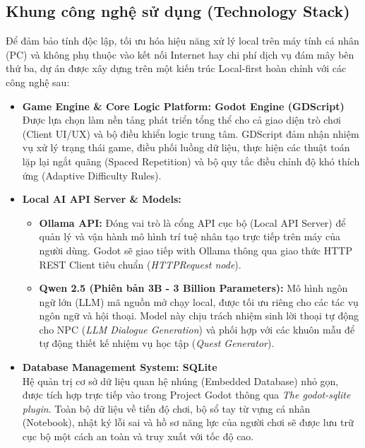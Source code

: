 \subsection{Khung công nghệ sử dụng (Technology Stack)}
Để đảm bảo tính độc lập, tối ưu hóa hiệu năng xử lý local trên máy tính cá nhân (PC) và không phụ thuộc vào kết nối Internet hay chi phí dịch vụ đám mây bên thứ ba, dự án được xây dựng trên một kiến trúc Local-first hoàn chỉnh với các công nghệ sau:

\begin{itemize}
    \item \textbf{Game Engine \& Core Logic Platform: Godot Engine (GDScript)} \\
    Được lựa chọn làm nền tảng phát triển tổng thể cho cả giao diện trò chơi (Client UI/UX) và bộ điều khiển logic trung tâm. GDScript đảm nhận nhiệm vụ xử lý trạng thái game, điều phối luồng dữ liệu, thực hiện các thuật toán lặp lại ngắt quãng (Spaced Repetition) và bộ quy tắc điều chỉnh độ khó thích ứng (Adaptive Difficulty Rules).
    
    \item \textbf{Local AI API Server \& Models:}
    \begin{itemize}
        \item \textbf{Ollama API:} Đóng vai trò là cổng API cục bộ (Local API Server) để quản lý và vận hành mô hình trí tuệ nhân tạo trực tiếp trên máy của người dùng. Godot sẽ giao tiếp with Ollama thông qua giao thức HTTP REST Client tiêu chuẩn (\textit{HTTPRequest node}).
        \item \textbf{Qwen 2.5 (Phiên bản 3B - 3 Billion Parameters):} Mô hình ngôn ngữ lớn (LLM) mã nguồn mở chạy local, được tối ưu riêng cho các tác vụ ngôn ngữ và hội thoại. Model này chịu trách nhiệm sinh lời thoại tự động cho NPC (\textit{LLM Dialogue Generation}) và phối hợp với các khuôn mẫu để tự động thiết kế nhiệm vụ học tập (\textit{Quest Generator}).
    \end{itemize}
    
    \item \textbf{Database Management System: SQLite} \\
    Hệ quản trị cơ sở dữ liệu quan hệ nhúng (Embedded Database) nhỏ gọn, được tích hợp trực tiếp vào trong Project Godot thông qua \textit{The godot-sqlite plugin}. Toàn bộ dữ liệu về tiến độ chơi, bộ sổ tay từ vựng cá nhân (Notebook), nhật ký lỗi sai và hồ sơ năng lực của người chơi sẽ được lưu trữ cục bộ một cách an toàn và truy xuất với tốc độ cao.
\end{itemize}


